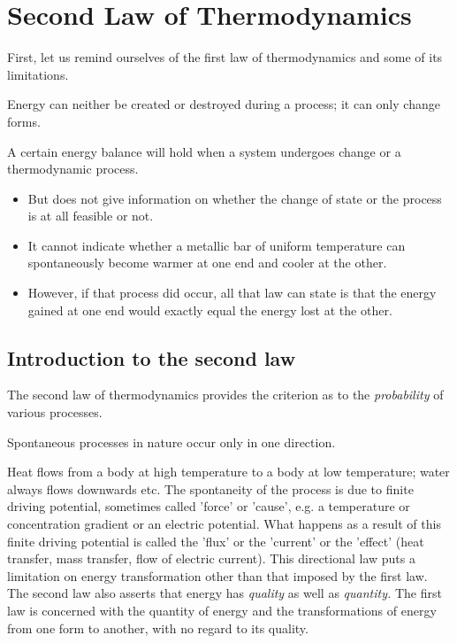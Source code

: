 \documentclass[class=report, crop=false, 12pt,a4paper]{standalone}
\begin{document}
\section{Second Law of Thermodynamics}
First, let us remind ourselves of the first law of thermodynamics and some of its limitations. 
\begin{center}
  Energy can neither be created or destroyed during a process; it can only change forms.
\end{center}
A certain energy balance will hold when a system undergoes change or a thermodynamic process.
\begin{itemize}[noitemsep]
  \item But does not give information on whether the change of state or the process is at all feasible or not.
  \item It cannot indicate whether a metallic bar of uniform temperature can spontaneously become warmer at one end and cooler at the other.
  \item However, if that process did occur, all that law can state is that the energy gained at one end would exactly equal the energy lost at the other.
\end{itemize}
\subsection{Introduction to the second law}
The second law of thermodynamics provides the criterion as to the \emph{probability} of various processes. 
  \begin{center}
    Spontaneous processes in nature occur only in one direction. 
  \end{center}
Heat flows from a body at high temperature to a body at low temperature; water always flows downwards etc. The spontaneity of the process is due to finite driving potential, sometimes called 'force' or 'cause', e.g. a temperature or concentration gradient or an electric potential. What happens as a result of this finite driving potential is called the 'flux' or the 'current' or the 'effect' (heat transfer, mass transfer, flow of electric current). This directional law puts a limitation on energy transformation other than that imposed by the first law. The second law also asserts that energy has \emph{quality} as well as \emph{quantity.} The first law is concerned with the quantity of energy and the transformations of energy from one form to another, with no regard to its quality. 
\end{document}
